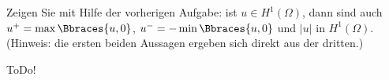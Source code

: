 
\begin{exercise}

Zeigen Sie mit Hilfe der vorherigen Aufgabe:
ist $u \in H^1(\Omega)$, dann sind auch $u^+ = \max \Bbraces{u, 0}$, $u^- = - \min \Bbraces{u, 0}$ und $|u|$ in $H^1(\Omega)$.
(Hinweis: die ersten beiden Aussagen ergeben sich direkt aus der dritten.)

\end{exercise}


\begin{solution}

ToDo!

\end{solution}

